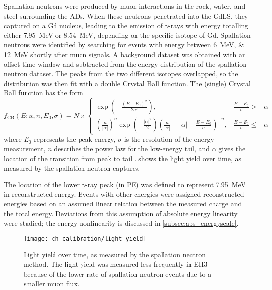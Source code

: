 Spallation neutrons were produced by muon interactions in the rock,
water, and steel surrounding the ADs.
When these neutrons penetrated into the GdLS,
they captured on a Gd nucleus, leading to the emission of $\gamma$-rays
with energy totalling either \SI{7.95}{\MeV} or \SI{8.54}{\MeV},
depending on the specific isotope of Gd.
Spallation neutrons were identified by searching for events
with energy between \SIlist{6;12}{\MeV} shortly after muon signals.
A background dataset was obtained with an offset time window
and subtracted from the energy distribution of the spallation neutron dataset.
The peaks from the two different isotopes overlapped,
so the distribution was then fit with a double Crystal Ball function.
The (single) Crystal Ball function has the form
\begin{equation}\label{eq:crystal_ball}
    f_\text{CB}(E;\alpha, n, E_0, \sigma) = N \times \begin{cases}
        \exp\left(-\frac{(E-E_0)^2}{2\sigma^2}\right),
            & \frac{E-E_0}{\sigma} > -\alpha \\
        \left(\frac{n}{|\alpha|}\right)^n \exp\left(-\frac{|\alpha|^2}{2}\right)
        \left(\frac{n}{|\alpha|} - |\alpha| - \frac{E-E_0}{\sigma}\right)^{-n},
            & \frac{E-E_0}{\sigma} \leq -\alpha
    \end{cases}
\end{equation}
where $E_0$ represents the peak energy,
$\sigma$ is the resolution of the energy measurement,
$n$ describes the power law for the low-energy tail,
and $\alpha$ gives the location of the transition from peak to tail \cite{cbfunction}.
 shows the light yield over time,
as measured by the spallation neutron captures.

The location of the lower $\gamma$-ray peak (in PE)
was defined to represent \SI{7.95}{\MeV} in reconstructed energy.
Events with other energies were assigned reconstructed energies
based on an assumed linear relation between the measured charge
and the total energy.
Deviations from this assumption of absolute energy linearity were studied;
the energy nonlinearity is discussed in \cref{subsec:abs_energyscale}.

\begin{figure}
    \centering
    \texttt{[image: ch\_calibration/light\_yield]}
    \caption[Light yield over time]{
        Light yield over time, as measured by the spallation neutron method.
        The light yield was measured less frequently in EH3
        because of the lower rate of spallation neutron events
        due to a smaller muon flux.
    }
    \label{fig:lightyield}
\end{figure}

